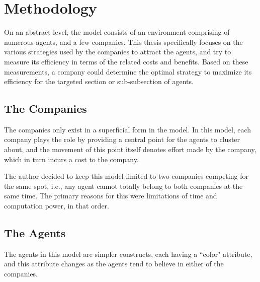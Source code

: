 
\chapter{Methodology} %

\label{Chapter3} %


On an abstract level, the model consists of an environment comprising of numerous agents, and a few companies. This thesis specifically focuses on the various strategies used by the companies to attract the agents, and try to measure its efficiency in terms of the related costs and benefits. Based on these measurements, a company could determine the optimal strategy to maximize its efficiency for the targeted section or sub-subsection of agents.


\section{The Companies}

The companies only exist in a superficial form in the model. In this model, each company plays the role by providing a central point for the agents to cluster about, and the movement of this point itself denotes effort made by the company, which in turn incurs a cost to the company.

The author decided to keep this model limited to two companies competing for the same spot, i.e., any agent cannot totally belong to both companies at the same time. 
The primary reasons for this were limitations of time and computation power, in that order.


\section{The Agents}

The agents in this model are simpler constructs, each  having a ``color" attribute, and this attribute changes as the agents tend to believe in either of the companies.

